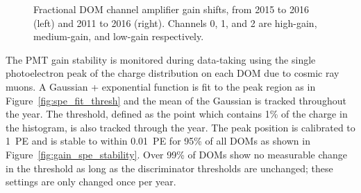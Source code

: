 \begin{figure}[!h]
  \captionsetup[subfigure]{labelformat=empty}
  \centering
  \caption{Fractional DOM channel amplifier gain shifts, from 2015 to
    2016 (left) and 2011 to 2016 (right).  Channels 0, 1, and 2 are
    high-gain, medium-gain, and low-gain respectively.}
  \label{fig:domcal_ch_gain}
\end{figure}

The PMT gain stability is monitored during data-taking using the
single photoelectron peak of the charge distribution on each DOM due
to cosmic ray muons. A
Gaussian + exponential function is fit to the peak region as in Figure~\ref{fig:spe_fit_thresh} and the mean of the Gaussian is
tracked throughout the year. The threshold, defined as the point which
contains 1\% of the charge in the histogram, is also tracked through
the year. The peak position is calibrated to 1~PE
and is stable to within 0.01~PE for 95\% of all DOMs as shown in
Figure~\ref{fig:gain_spe_stability}. Over 99\% of DOMs show no
measurable change in the threshold as long as the discriminator
thresholds are unchanged; these settings are only changed once per year.


